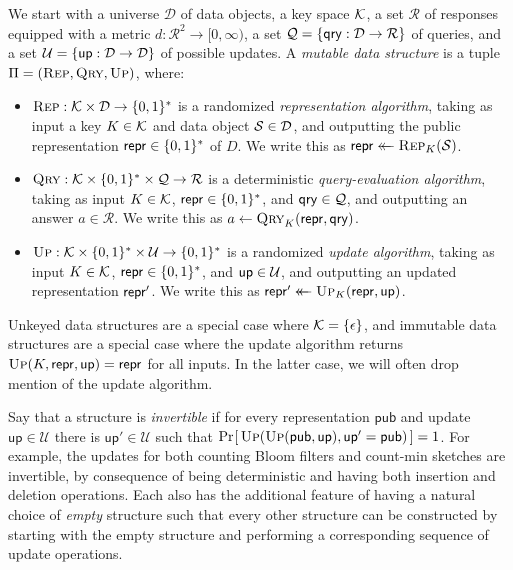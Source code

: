 We start with a universe $\mathcal{D}$ of data objects, a key space $\mathcal{K}$, a set $\mathcal{R}$ of responses equipped with a metric $d: \mathcal{R}^2 \to [0,\infty)$, a set $\mathcal{Q} = \{\mathsf{qry}: \mathcal{D} \to \mathcal{R}\}$ of queries, and a set $\mathcal{U} = \{\mathsf{up}: \mathcal{D} \to \mathcal{D}\}$ of possible updates. A {\em mutable data structure} is a tuple $\Pi = (\textsc{Rep},\textsc{Qry},\textsc{Up})$, where: 

\begin{itemize}
  \item $\textsc{Rep}: \mathcal{K} \times \mathcal{D} \to \{0,1\}^*$ is a randomized {\em representation algorithm}, taking as input a key $K \in \mathcal{K}$ and data object $\mathcal{S} \in \mathcal{D}$, and outputting the public representation $\mathsf{repr} \in \{0,1\}^*$ of $D$. We write this as $\mathsf{repr} \mathrel{\leftarrow\mkern-14mu\leftarrow} \textsc{Rep}_K(\mathcal{S})$.
  \item $\textsc{Qry}: \mathcal{K} \times \{0,1\}^* \times \mathcal{Q} \to \mathcal{R}$ is a deterministic {\em query-evaluation algorithm}, taking as input $K \in \mathcal{K}$, $\mathsf{repr} \in \{0,1\}^*$, and $\mathsf{qry} \in \mathcal{Q}$, and outputting an answer $a \in \mathcal{R}$. We write this as $a \gets \textsc{Qry}_K(\mathsf{repr},\mathsf{qry})$.
  \item $\textsc{Up}: \mathcal{K} \times \{0,1\}^* \times \mathcal{U} \to \{0,1\}^*$ is a randomized {\em update algorithm}, taking as input $K \in \mathcal{K}$, $\mathsf{repr} \in \{0,1\}^*$, and $\mathsf{up} \in \mathcal{U}$, and outputting an updated representation $\mathsf{repr}'$. We write this as $\mathsf{repr}' \mathrel{\leftarrow\mkern-14mu\leftarrow} \textsc{Up}_K(\mathsf{repr},\mathsf{up})$.
\end{itemize}

Unkeyed data structures are a special case where $\mathcal{K} = \{\epsilon\}$, and immutable data structures are a special case where the update algorithm returns $\textsc{Up}(K,\mathsf{repr},\mathsf{up})=\mathsf{repr}$ for all inputs.  In the latter case, we will often drop mention of the update algorithm.


Say that a structure is {\em invertible} if for every representation $\mathsf{pub}$ and update $\mathsf{up} \in \mathcal{U}$ there is $\mathsf{up}' \in \mathcal{U}$ such that $\Pr\hspace{-1pt}\left[\,\textsc{Up}(\textsc{Up}(\mathsf{pub},\mathsf{up}),\mathsf{up}' = \mathsf{pub})\,\right] = 1$.  For example, the updates for both counting Bloom filters and count-min sketches are invertible, by consequence of being deterministic and having both insertion and deletion operations. Each also has the additional feature of having a natural choice of {\em empty} structure such that every other structure can be constructed by starting with the empty structure and performing a corresponding sequence of update operations.

 